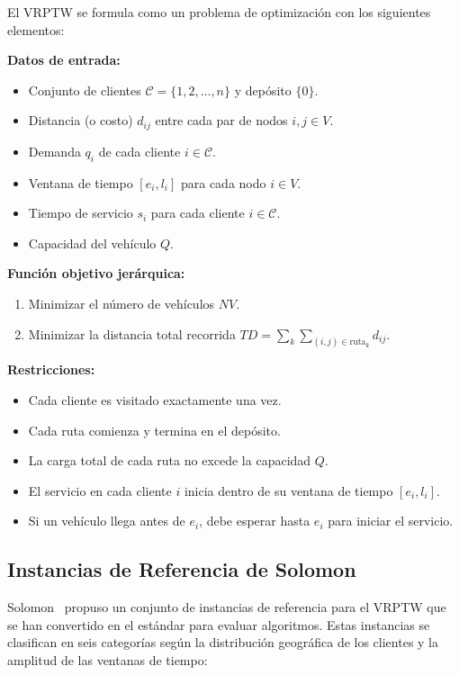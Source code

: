 \documentclass[12pt, letterpaper]{article}
\begin{document}
El VRPTW se formula como un problema de optimización con los siguientes elementos:

\textbf{Datos de entrada:}
\begin{itemize}[leftmargin=2cm]
  \item Conjunto de clientes $\mathcal{C} = \{1, 2, \ldots, n\}$ y depósito $\{0\}$.
  \item Distancia (o costo) $d_{ij}$ entre cada par de nodos $i, j \in V$.
  \item Demanda $q_i$ de cada cliente $i \in \mathcal{C}$.
  \item Ventana de tiempo $[e_i, l_i]$ para cada nodo $i \in V$.
  \item Tiempo de servicio $s_i$ para cada cliente $i \in \mathcal{C}$.
  \item Capacidad del vehículo $Q$.
\end{itemize}

\textbf{Función objetivo jerárquica:}
\begin{enumerate}[leftmargin=2cm]
  \item Minimizar el número de vehículos $NV$.
  \item Minimizar la distancia total recorrida $TD = \sum_{k} \sum_{(i,j) \in \text{ruta}_k} d_{ij}$.
\end{enumerate}

\textbf{Restricciones:}
\begin{itemize}[leftmargin=2cm]
  \item Cada cliente es visitado exactamente una vez.
  \item Cada ruta comienza y termina en el depósito.
  \item La carga total de cada ruta no excede la capacidad $Q$.
  \item El servicio en cada cliente $i$ inicia dentro de su ventana de tiempo $[e_i, l_i]$.
  \item Si un vehículo llega antes de $e_i$, debe esperar hasta $e_i$ para iniciar el servicio.
\end{itemize}

\subsection{Instancias de Referencia de Solomon}
\label{subsec:solomon_benchmarks}

Solomon~\cite{solomon1987} propuso un conjunto de instancias de referencia para el VRPTW que se han convertido en el estándar para evaluar algoritmos. Estas instancias se clasifican en seis categorías según la distribución geográfica de los clientes y la amplitud de las ventanas de tiempo:
\end{document}
